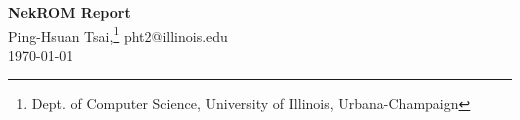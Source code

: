\documentclass[11pt]{article}
\begin{document}
\setlength{\parindent}{0.25in}

\medskip                        %

\thispagestyle{plain}
\begin{center}                  %
   \textbf{\Large NekROM Report}
   \\[2ex]
Ping-Hsuan Tsai,\footnote{Dept. of Computer Science, University of Illinois, Urbana-Champaign}
pht2@illinois.edu \\
\today
\end{center}


%
%

\nocite{*}


\end{document}
